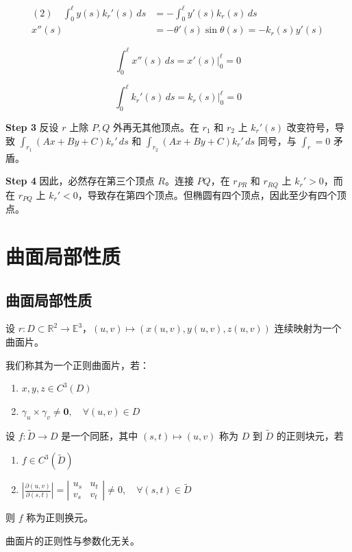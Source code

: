 \documentclass[lang=cn,10pt,thmcnt=section]{elegantbook}
\renewcommand{\vec}[1]{\mathbf{#1}}
\begin{document}
    \begin{align*}
    (2) \quad \int_0^{\ell} y(s) k_r'(s) \, ds &= -\int_0^{\ell} y'(s) k_r(s) \, ds \\
    x''(s) &= -\theta'(s) \sin \theta(s) = -k_r(s) y'(s)
    \end{align*}
    
    $$
    \int_0^{\ell} x''(s) \, ds = \left. x'(s) \right|_0^{\ell} = 0
    $$
    
    $$
    \int_0^{\ell} k_r'(s) \, ds = \left. k_r(s) \right|_0^{\ell} = 0
    $$
    
    \textbf{Step 3} 反设 $r$ 上除 $P, Q$ 外再无其他顶点。在 $r_1$ 和 $r_2$ 上 $k_r'(s)$ 改变符号，导致 $\int_{r_1} (Ax + By + C) k_r' \, ds$ 和 $\int_{r_2} (Ax + By + C) k_r' \, ds$ 同号，与 $\int_r = 0$ 矛盾。
    
    \textbf{Step 4} 因此，必然存在第三个顶点 $R$。连接 $PQ$，在 $r_{PR}$ 和 $r_{RQ}$ 上 $k_r' > 0$，而在 $r_{PQ}$ 上 $k_r' < 0$，导致存在第四个顶点。但椭圆有四个顶点，因此至少有四个顶点。

\chapter{曲面局部性质}
\section{曲面局部性质}
\begin{definition}[正则曲面片]
    设 $r: D \subset \mathbb{R}^2 \rightarrow \mathbb{E}^3$，$(u,v) \mapsto (x(u,v), y(u,v), z(u,v))$ 连续映射为一个曲面片。
    
    我们称其为一个正则曲面片，若：
    \begin{enumerate}
        \item $x, y, z \in C^3(D)$
        \item $\gamma_u \times \gamma_v \neq \vec{0}, \quad \forall (u,v) \in D$
    \end{enumerate}
    \end{definition}
\begin{definition}[正则换元]
        设 $f: \widetilde{D} \rightarrow D$ 是一个同胚，其中 $(s,t) \mapsto (u,v)$ 称为 $D$ 到 $\widetilde{D}$ 的正则块元，若
        \begin{enumerate}
            \item $f \in C^3(\widetilde{D})$
            \item $\left| \frac{\partial (u,v)}{\partial (s,t)} \right| = \left| \begin{matrix} u_s & u_t \\ v_s & v_t \end{matrix} \right| \neq 0, \quad \forall (s,t) \in \widetilde{D}$
        \end{enumerate}
        则 $f$ 称为正则换元。
\end{definition}  
\begin{proposition}
    曲面片的正则性与参数化无关。
    \end{proposition}
    
\end{document}
